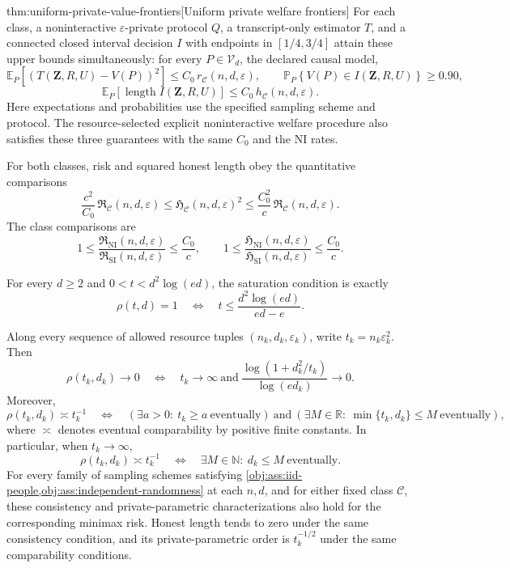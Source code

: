 \begin{theoremv}{thm:uniform-private-value-frontiers}[Uniform private welfare frontiers]
For each class, a noninteractive \(\varepsilon\)-private protocol \(Q\), a transcript-only estimator \(T\), and a connected closed interval decision \(I\) with endpoints in \([1/4,3/4]\) attain these upper bounds simultaneously: for every \(P\in\mathcal V_d\), the declared causal model,
\[
\mathbb E_P\!\left[(T(\mathbf Z,R,U)-V(P))^2\right]
\le C_0\,r_{\mathcal C}(n,d,\varepsilon),
\qquad
\mathbb P_P\!\left\{V(P)\in I(\mathbf Z,R,U)\right\}\ge0.90,
\]
\[
\mathbb E_P\!\left[\operatorname{length}
 I(\mathbf Z,R,U)\right]
\le C_0\,h_{\mathcal C}(n,d,\varepsilon).
\]
Here expectations and probabilities use the specified sampling scheme and protocol. The resource-selected explicit noninteractive welfare procedure also satisfies these three guarantees with the same \(C_0\) and the NI rates.

For both classes, risk and squared honest length obey the quantitative comparisons
\[
\frac{c^2}{C_0}\,
\mathfrak R_{\mathcal C}(n,d,\varepsilon)
\le
\mathfrak H_{\mathcal C}(n,d,\varepsilon)^2
\le
\frac{C_0^2}{c}\,
\mathfrak R_{\mathcal C}(n,d,\varepsilon).
\]
The class comparisons are
\[
1\le
\frac{\mathfrak R_{\mathrm{NI}}(n,d,\varepsilon)}
     {\mathfrak R_{\mathrm{SI}}(n,d,\varepsilon)}
\le\frac{C_0}{c},
\qquad
1\le
\frac{\mathfrak H_{\mathrm{NI}}(n,d,\varepsilon)}
     {\mathfrak H_{\mathrm{SI}}(n,d,\varepsilon)}
\le\frac{C_0}{c}.
\]

For every \(d\ge2\) and \(0<t<d^2\log(ed)\), the saturation condition is exactly
\[
\rho(t,d)=1
\quad\Longleftrightarrow\quad
t\le\frac{d^2\log(ed)}{ed-e}.
\]

Along every sequence of allowed resource tuples
\((n_k,d_k,\varepsilon_k)\), write \(t_k=n_k\varepsilon_k^2\). Then
\[
\rho(t_k,d_k)\longrightarrow0
\quad\Longleftrightarrow\quad
t_k\longrightarrow\infty
\ \text{and}\
\frac{\log(1+d_k^2/t_k)}{\log(ed_k)}\longrightarrow0.
\]
Moreover,
\[
\rho(t_k,d_k)\asymp t_k^{-1}
\quad\Longleftrightarrow\quad
\left(\exists a>0:\ t_k\ge a\ \text{eventually}\right)
\ \text{and}\
\left(\exists M\in\mathbb R:\ \min\{t_k,d_k\}\le M\
\text{eventually}\right),
\]
where \(\asymp\) denotes eventual comparability by positive finite constants. In particular, when \(t_k\to\infty\),
\[
\rho(t_k,d_k)\asymp t_k^{-1}
\quad\Longleftrightarrow\quad
\exists M\in\mathbb N:\ d_k\le M\ \text{eventually}.
\]
For every family of sampling schemes satisfying
\cref{obj:ass:iid-people,obj:ass:independent-randomness} at each \(n,d\), and for either fixed class \(\mathcal C\), these consistency and private-parametric characterizations also hold for the corresponding minimax risk. Honest length tends to zero under the same consistency condition, and its private-parametric order is \(t_k^{-1/2}\) under the same comparability conditions.


\end{theoremv}
